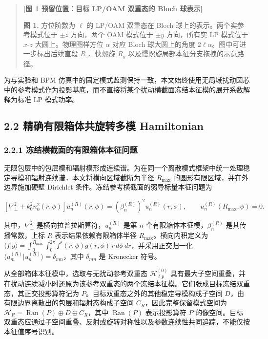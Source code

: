 \documentclass[
  UTF8,
  zihao=-4,
  fontset=fandol]{ctexart}
\begin{document}
\begin{quote}
\textbf{{[}图 1 预留位置：目标 LP/OAM 双重态的 Bloch 球表示{]}}

\textbf{图 1.} 方位阶数为 \(\ell\) 的 LP/OAM 双重态在 Bloch
球上的表示。两个实参考模式位于 \(\pm z\) 方向，两个 OAM 模式位于
\(\pm y\) 方向，所有实 LP 模式位于 \(x\)-\(z\) 大圆上。物理图样方位
\(\alpha\) 对应 Bloch 球大圆上的角度
\(2\ell\alpha\)。图中可进一步标出后续直段 \(R_z\)、快螺旋 \(R_y\)
以及慢螺旋局部本征分支拖拽的示意路径。
\end{quote}

为与实验和 BPM
仿真中的固定模式监测保持一致，本文始终使用无局域扰动圆芯中的参考模式作为投影基底，而不直接将某个扰动横截面冻结本征模的展开系数解释为标准
LP 模式功率。

\hypertarget{ux7cbeux786eux6709ux9650ux7bb1ux4f53ux5171ux65cbux8f6cux591aux6a21-hamiltonian}{%
\subsection{2.2 精确有限箱体共旋转多模
Hamiltonian}\label{ux7cbeux786eux6709ux9650ux7bb1ux4f53ux5171ux65cbux8f6cux591aux6a21-hamiltonian}}

\hypertarget{ux51bbux7ed3ux6a2aux622aux9762ux7684ux6709ux9650ux7bb1ux4f53ux672cux5f81ux95eeux9898}{%
\subsubsection{2.2.1
冻结横截面的有限箱体本征问题}\label{ux51bbux7ed3ux6a2aux622aux9762ux7684ux6709ux9650ux7bb1ux4f53ux672cux5f81ux95eeux9898}}

无限包层中的包层模和辐射模形成连续谱。为在同一个离散模式框架中统一处理稳定导模和辐射连续谱，本文将横向区域截断为半径
\(R_{\max}\) 的圆形有限区域，并在外边界施加硬壁 Dirichlet
条件。冻结参考横截面的弱导标量本征问题为

\[
\left[\nabla_\perp^2+k_0^2n_0^2(r,\phi)\right]u_n^{(R)}(r,\phi)
=\left(\beta_n^{(R)}\right)^2u_n^{(R)}(r,\phi),\qquad
u_n^{(R)}(R_{\max},\phi)=0.
\tag{2}
\]

其中，\(\nabla_\perp^2\) 是横向拉普拉斯算符，\(u_n^{(R)}\) 是第 \(n\)
个有限箱体本征模，\(\beta_n^{(R)}\) 是其传播常数，上标 \(R\)
表示结果依赖有限箱体半径 \(R_{\max}\)。横向内积定义为
\(\langle f|g\rangle=\int_0^{R_{\max}}\int_0^{2\pi}f^*(r,\phi)g(r,\phi)\,r\,d\phi\,dr\)，并采用正交归一化
\(\langle u_m^{(R)}|u_n^{(R)}\rangle=\delta_{mn}\)，其中 \(\delta_{mn}\)
是 Kronecker 符号。

从全部箱体本征模中，选取与无扰动参考双重态 \(\mathcal H_{\ell p}^{(0)}\)
具有最大子空间重叠，并在扰动连续减小时还原为该参考双重态的两个冻结本征模。它们张成目标冻结双重态，其正交投影算符记为
\(P\)。目标双重态之外的其他稳定导模构成子空间
\(D\)，由有限边界离散出的包层和辐射态构成子空间
\(C_R\)，因此完整保留模式空间为
\(\mathcal H_R=\operatorname{Ran}(P)\oplus D\oplus C_R\)，其中
\(\operatorname{Ran}(P)\) 表示投影算符 \(P\)
的像空间。目标双重态应通过子空间重叠、反射或旋转对称性以及参数连续性共同追踪，不能仅按本征值序号识别。
\end{document}
